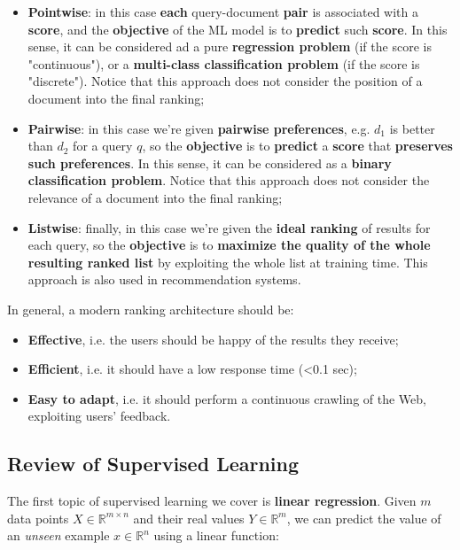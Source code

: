 \begin{itemize}
    \item \textbf{Pointwise}: in this case \textbf{each} query-document \textbf{pair} is associated with a \textbf{score}, and the \textbf{objective} of the ML model is to \textbf{predict} such \textbf{score}. In this sense, it can be considered ad a pure \textbf{regression problem} (if the score is "continuous"), or a \textbf{multi-class classification problem} (if the score is "discrete"). Notice that this approach does not consider the position of a document into the final ranking;
    \item \textbf{Pairwise}: in this case we're given \textbf{pairwise preferences}, e.g. $d_1$ is better than $d_2$ for a query $q$, so the \textbf{objective} is to \textbf{predict} a \textbf{score} that \textbf{preserves such preferences}. In this sense, it can be considered as a \textbf{binary classification problem}. Notice that this approach does not consider the relevance of a document into the final ranking;
    \item \textbf{Listwise}: finally, in this case we're given the \textbf{ideal ranking} of results for each query, so the \textbf{objective} is to \textbf{maximize the quality of the whole resulting ranked list} by exploiting the whole list at training time. This approach is also used in recommendation systems.
\end{itemize}

In general, a modern ranking architecture should be:

\begin{itemize}
    \item \textbf{Effective}, i.e. the users should be happy of the results they receive;
    \item \textbf{Efficient}, i.e. it should have a low response time (<0.1 sec);
    \item \textbf{Easy to adapt}, i.e. it should perform a continuous crawling of the Web, exploiting users' feedback.
\end{itemize}


\subsection{Review of Supervised Learning}
The first topic of supervised learning we cover is \textbf{linear regression}. Given $m$ data points $X \in \mathbb{R}^{m \times n}$ and their real values $Y \in \mathbb{R}^m$, we can predict the value of an \textit{unseen} example $x \in \mathbb{R}^n$ using a linear function:

